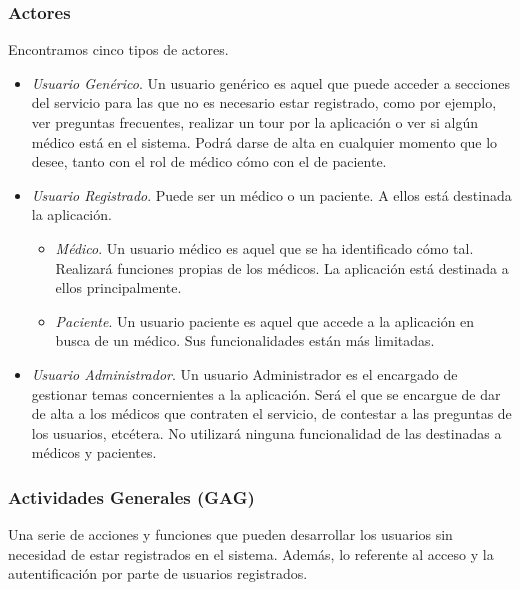 \documentclass[a4paper,oneside,11pt]{book}
\begin{document}
			\subsubsection{Actores} %
			\label{sub:actores}
				Encontramos cinco tipos de actores.
				\begin{itemize}
					\item \textit{Usuario Genérico}. Un usuario genérico es aquel que puede acceder a secciones del servicio para las que no es necesario estar registrado, como por ejemplo, ver preguntas frecuentes, realizar un tour por la aplicación o ver si algún médico está en el sistema. Podrá darse de alta en cualquier momento que lo desee, tanto con el rol de médico cómo con el de paciente.
					\item \textit{Usuario Registrado}. Puede ser un médico o un paciente. A ellos está destinada la aplicación.
						\begin{itemize}
							\item \textit{Médico}. Un usuario médico es aquel que se ha identificado cómo tal. Realizará funciones propias de los médicos. La aplicación está destinada a ellos principalmente.
							\item \textit{Paciente}. Un usuario paciente es aquel que accede a la aplicación en busca de un médico. Sus funcionalidades están más limitadas.
						\end{itemize}
					\item \textit{Usuario Administrador}. Un usuario Administrador es el encargado de gestionar temas concernientes a la aplicación. Será el que se encargue de dar de alta a los médicos que contraten el servicio, de contestar a las preguntas de los usuarios, etcétera. No utilizará ninguna funcionalidad de las destinadas a médicos y pacientes.
					 
				\end{itemize}
			\newpage
			\subsubsection{Actividades Generales (GAG)} %
			\label{sub:actividades_generales_gag_}
			
				Una serie de acciones y funciones que pueden desarrollar los usuarios sin necesidad de estar registrados en el sistema. Además, lo referente al acceso y la autentificación por parte de usuarios registrados.
				\bigskip
			
\end{document}
